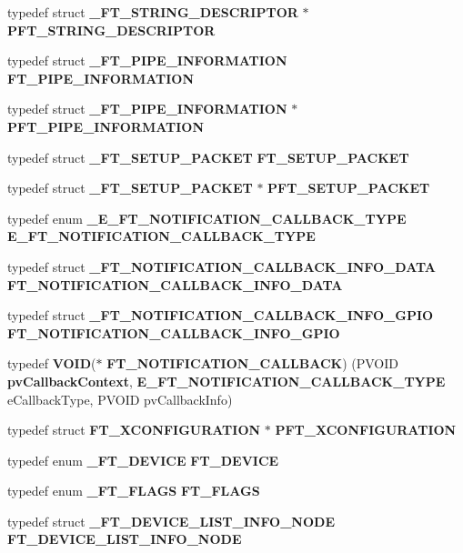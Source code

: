 \begin{DoxyCompactItemize}
\item 
typedef struct {\bf \+\_\+\+F\+T\+\_\+\+S\+T\+R\+I\+N\+G\+\_\+\+D\+E\+S\+C\+R\+I\+P\+T\+OR} $\ast$ {\bf P\+F\+T\+\_\+\+S\+T\+R\+I\+N\+G\+\_\+\+D\+E\+S\+C\+R\+I\+P\+T\+OR}
\item 
typedef struct {\bf \+\_\+\+F\+T\+\_\+\+P\+I\+P\+E\+\_\+\+I\+N\+F\+O\+R\+M\+A\+T\+I\+ON} {\bf F\+T\+\_\+\+P\+I\+P\+E\+\_\+\+I\+N\+F\+O\+R\+M\+A\+T\+I\+ON}
\item 
typedef struct {\bf \+\_\+\+F\+T\+\_\+\+P\+I\+P\+E\+\_\+\+I\+N\+F\+O\+R\+M\+A\+T\+I\+ON} $\ast$ {\bf P\+F\+T\+\_\+\+P\+I\+P\+E\+\_\+\+I\+N\+F\+O\+R\+M\+A\+T\+I\+ON}
\item 
typedef struct {\bf \+\_\+\+F\+T\+\_\+\+S\+E\+T\+U\+P\+\_\+\+P\+A\+C\+K\+ET} {\bf F\+T\+\_\+\+S\+E\+T\+U\+P\+\_\+\+P\+A\+C\+K\+ET}
\item 
typedef struct {\bf \+\_\+\+F\+T\+\_\+\+S\+E\+T\+U\+P\+\_\+\+P\+A\+C\+K\+ET} $\ast$ {\bf P\+F\+T\+\_\+\+S\+E\+T\+U\+P\+\_\+\+P\+A\+C\+K\+ET}
\item 
typedef enum {\bf \+\_\+\+E\+\_\+\+F\+T\+\_\+\+N\+O\+T\+I\+F\+I\+C\+A\+T\+I\+O\+N\+\_\+\+C\+A\+L\+L\+B\+A\+C\+K\+\_\+\+T\+Y\+PE} {\bf E\+\_\+\+F\+T\+\_\+\+N\+O\+T\+I\+F\+I\+C\+A\+T\+I\+O\+N\+\_\+\+C\+A\+L\+L\+B\+A\+C\+K\+\_\+\+T\+Y\+PE}
\item 
typedef struct {\bf \+\_\+\+F\+T\+\_\+\+N\+O\+T\+I\+F\+I\+C\+A\+T\+I\+O\+N\+\_\+\+C\+A\+L\+L\+B\+A\+C\+K\+\_\+\+I\+N\+F\+O\+\_\+\+D\+A\+TA} {\bf F\+T\+\_\+\+N\+O\+T\+I\+F\+I\+C\+A\+T\+I\+O\+N\+\_\+\+C\+A\+L\+L\+B\+A\+C\+K\+\_\+\+I\+N\+F\+O\+\_\+\+D\+A\+TA}
\item 
typedef struct {\bf \+\_\+\+F\+T\+\_\+\+N\+O\+T\+I\+F\+I\+C\+A\+T\+I\+O\+N\+\_\+\+C\+A\+L\+L\+B\+A\+C\+K\+\_\+\+I\+N\+F\+O\+\_\+\+G\+P\+IO} {\bf F\+T\+\_\+\+N\+O\+T\+I\+F\+I\+C\+A\+T\+I\+O\+N\+\_\+\+C\+A\+L\+L\+B\+A\+C\+K\+\_\+\+I\+N\+F\+O\+\_\+\+G\+P\+IO}
\item 
typedef {\bf V\+O\+ID}($\ast$ {\bf F\+T\+\_\+\+N\+O\+T\+I\+F\+I\+C\+A\+T\+I\+O\+N\+\_\+\+C\+A\+L\+L\+B\+A\+CK}) (P\+V\+O\+ID {\bf pv\+Callback\+Context}, {\bf E\+\_\+\+F\+T\+\_\+\+N\+O\+T\+I\+F\+I\+C\+A\+T\+I\+O\+N\+\_\+\+C\+A\+L\+L\+B\+A\+C\+K\+\_\+\+T\+Y\+PE} e\+Callback\+Type, P\+V\+O\+ID pv\+Callback\+Info)
\item 
typedef struct {\bf F\+T\+\_\+X\+C\+O\+N\+F\+I\+G\+U\+R\+A\+T\+I\+ON} $\ast$ {\bf P\+F\+T\+\_\+X\+C\+O\+N\+F\+I\+G\+U\+R\+A\+T\+I\+ON}
\item 
typedef enum {\bf \+\_\+\+F\+T\+\_\+\+D\+E\+V\+I\+CE} {\bf F\+T\+\_\+\+D\+E\+V\+I\+CE}
\item 
typedef enum {\bf \+\_\+\+F\+T\+\_\+\+F\+L\+A\+GS} {\bf F\+T\+\_\+\+F\+L\+A\+GS}
\item 
typedef struct {\bf \+\_\+\+F\+T\+\_\+\+D\+E\+V\+I\+C\+E\+\_\+\+L\+I\+S\+T\+\_\+\+I\+N\+F\+O\+\_\+\+N\+O\+DE} {\bf F\+T\+\_\+\+D\+E\+V\+I\+C\+E\+\_\+\+L\+I\+S\+T\+\_\+\+I\+N\+F\+O\+\_\+\+N\+O\+DE}
\end{DoxyCompactItemize}
